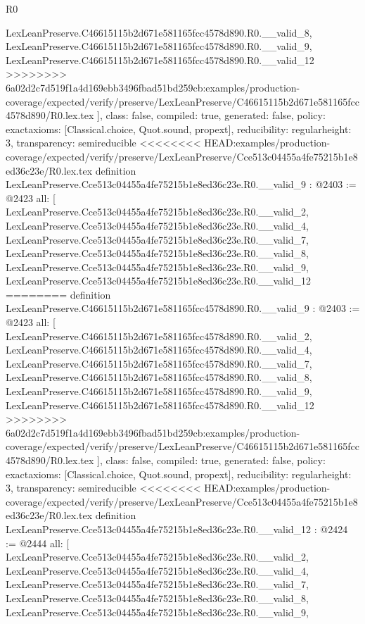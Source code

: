 \begin{lexlean}{R0}
\begin{coremodule}
{{{{{{{{{{{{{{{{{{{{{{{{{{{{{{{{{{{{{{{{{{{{{{{{    LexLeanPreserve.C46615115b2d671e581165fcc4578d890.R0.__valid_8,
    LexLeanPreserve.C46615115b2d671e581165fcc4578d890.R0.__valid_9,
    LexLeanPreserve.C46615115b2d671e581165fcc4578d890.R0.__valid_12
>>>>>>>> 6a02d2c7d519f1a4d169ebb3496fbad51bd259cb:examples/production-coverage/expected/verify/preserve/LexLeanPreserve/C46615115b2d671e581165fcc4578d890/R0.lex.tex
  ],
  class: false,
  compiled: true,
  generated: false,
  policy: exact{axioms: [Classical.choice, Quot.sound, propext]},
  reducibility: regular{height: 3},
  transparency: semireducible
}
<<<<<<<< HEAD:examples/production-coverage/expected/verify/preserve/LexLeanPreserve/Cce513c04455a4fe75215b1e8ed36c23e/R0.lex.tex
definition LexLeanPreserve.Cce513c04455a4fe75215b1e8ed36c23e.R0.__valid_9 : @2403 := @2423 {
  all: [
    LexLeanPreserve.Cce513c04455a4fe75215b1e8ed36c23e.R0.__valid_2,
    LexLeanPreserve.Cce513c04455a4fe75215b1e8ed36c23e.R0.__valid_4,
    LexLeanPreserve.Cce513c04455a4fe75215b1e8ed36c23e.R0.__valid_7,
    LexLeanPreserve.Cce513c04455a4fe75215b1e8ed36c23e.R0.__valid_8,
    LexLeanPreserve.Cce513c04455a4fe75215b1e8ed36c23e.R0.__valid_9,
    LexLeanPreserve.Cce513c04455a4fe75215b1e8ed36c23e.R0.__valid_12
========
definition LexLeanPreserve.C46615115b2d671e581165fcc4578d890.R0.__valid_9 : @2403 := @2423 {
  all: [
    LexLeanPreserve.C46615115b2d671e581165fcc4578d890.R0.__valid_2,
    LexLeanPreserve.C46615115b2d671e581165fcc4578d890.R0.__valid_4,
    LexLeanPreserve.C46615115b2d671e581165fcc4578d890.R0.__valid_7,
    LexLeanPreserve.C46615115b2d671e581165fcc4578d890.R0.__valid_8,
    LexLeanPreserve.C46615115b2d671e581165fcc4578d890.R0.__valid_9,
    LexLeanPreserve.C46615115b2d671e581165fcc4578d890.R0.__valid_12
>>>>>>>> 6a02d2c7d519f1a4d169ebb3496fbad51bd259cb:examples/production-coverage/expected/verify/preserve/LexLeanPreserve/C46615115b2d671e581165fcc4578d890/R0.lex.tex
  ],
  class: false,
  compiled: true,
  generated: false,
  policy: exact{axioms: [Classical.choice, Quot.sound, propext]},
  reducibility: regular{height: 3},
  transparency: semireducible
}
<<<<<<<< HEAD:examples/production-coverage/expected/verify/preserve/LexLeanPreserve/Cce513c04455a4fe75215b1e8ed36c23e/R0.lex.tex
definition LexLeanPreserve.Cce513c04455a4fe75215b1e8ed36c23e.R0.__valid_12 : @2424 := @2444 {
  all: [
    LexLeanPreserve.Cce513c04455a4fe75215b1e8ed36c23e.R0.__valid_2,
    LexLeanPreserve.Cce513c04455a4fe75215b1e8ed36c23e.R0.__valid_4,
    LexLeanPreserve.Cce513c04455a4fe75215b1e8ed36c23e.R0.__valid_7,
    LexLeanPreserve.Cce513c04455a4fe75215b1e8ed36c23e.R0.__valid_8,
    LexLeanPreserve.Cce513c04455a4fe75215b1e8ed36c23e.R0.__valid_9,
}}}}}}}}}}}}}}}}}}}}}}}}}}}}}}}}}}}}}}}}}}}}}}}}}
\end{coremodule}
\end{lexlean}
